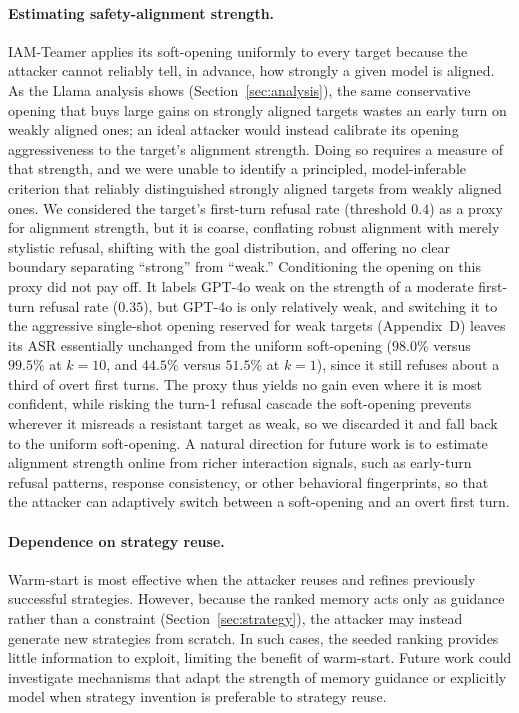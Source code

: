 \documentclass[a4paper,fleqn]{cas-sc}
\begin{document}
\paragraph{Estimating safety-alignment strength.}
IAM-Teamer applies its soft-opening uniformly to every target because the attacker cannot reliably tell, in advance, how strongly a given model is aligned.
As the Llama analysis shows (Section~\ref{sec:analysis}), the same conservative opening that buys large gains on strongly aligned targets wastes an early turn on weakly aligned ones; an ideal attacker would instead calibrate its opening aggressiveness to the target's alignment strength.
Doing so requires a measure of that strength, and we were unable to identify a principled, model-inferable criterion that reliably distinguished strongly aligned targets from weakly aligned ones.
We considered the target's first-turn refusal rate (threshold $0.4$) as a proxy for alignment strength, but it is coarse, conflating robust alignment with merely stylistic refusal, shifting with the goal distribution, and offering no clear boundary separating ``strong'' from ``weak.''
Conditioning the opening on this proxy did not pay off.
It labels GPT-4o weak on the strength of a moderate first-turn refusal rate ($0.35$), but GPT-4o is only relatively weak, and switching it to the aggressive single-shot opening reserved for weak targets (Appendix~D) leaves its ASR essentially unchanged from the uniform soft-opening ($98.0\%$ versus $99.5\%$ at $k{=}10$, and $44.5\%$ versus $51.5\%$ at $k{=}1$), since it still refuses about a third of overt first turns.
The proxy thus yields no gain even where it is most confident, while risking the turn-1 refusal cascade the soft-opening prevents wherever it misreads a resistant target as weak, so we discarded it and fall back to the uniform soft-opening.
A natural direction for future work is to estimate alignment strength online from richer interaction signals, such as early-turn refusal patterns, response consistency, or other behavioral fingerprints, so that the attacker can adaptively switch between a soft-opening and an overt first turn.

\paragraph{Dependence on strategy reuse.}
Warm-start is most effective when the attacker reuses and refines previously successful strategies.
However, because the ranked memory acts only as guidance rather than a constraint (Section~\ref{sec:strategy}), the attacker may instead generate new strategies from scratch.
In such cases, the seeded ranking provides little information to exploit, limiting the benefit of warm-start.
Future work could investigate mechanisms that adapt the strength of memory guidance or explicitly model when strategy invention is preferable to strategy reuse.
\end{document}
